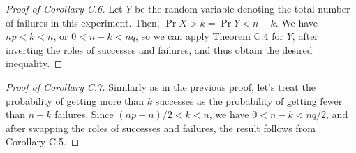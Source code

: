 \begin{proof}[Proof of Corollary C.6]
    Let $Y$ be the random variable denoting the total number of failures in this experiment.
    Then, $\Pr{X>k}=\Pr{Y<n-k}$.
    We have $np<k<n$, or $0<n-k<nq$, so we can apply Theorem C.4 for $Y$, after inverting the roles of successes and failures, and thus obtain the desired inequality.
\end{proof}

\bigskip
\begin{proof}[Proof of Corollary C.7]
    Similarly as in the previous proof, let's treat the probability of getting more than $k$ successes as the probability of getting fewer than $n-k$ failures.
    Since $(np+n)/2<k<n$, we have $0<n-k<nq/2$, and after swapping the roles of successes and failures, the result follows from Corollary C.5.
\end{proof}
